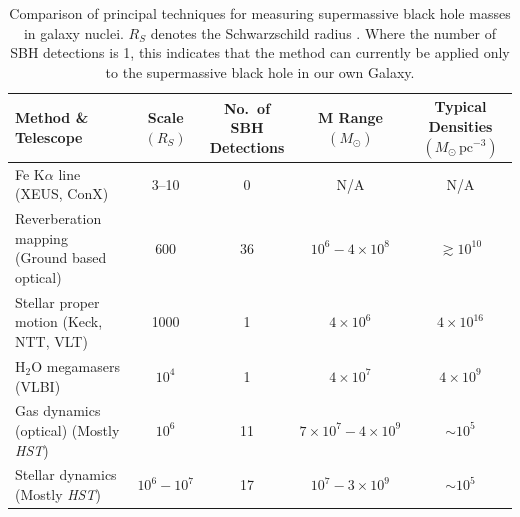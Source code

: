 \begin{table}[h!]
    \centering
    \footnotesize
    \begin{tabular}{p{4cm} c c c c}
        \toprule
        \textbf{Method \& Telescope} & 
        \makecell{\textbf{Scale} \\ $(R_S)$} & 
        \makecell{\textbf{No.\ of SBH} \\ \textbf{Detections}} & 
        \makecell{$\mathbf{M}$ \textbf{Range} \\ $(M_\odot)$} & 
        \makecell{\textbf{Typical Densities} \\ $(M_\odot\,\mathrm{pc}^{-3})$} \\
        \midrule
        
        Fe K$\alpha$ line \newline (XEUS, ConX) 
            & 3--10 
            & 0 
            & N/A 
            & N/A \\
        \addlinespace
        Reverberation mapping \newline (Ground based optical) 
            & 600 
            & 36 
            & $10^6 - 4 \times 10^8$ 
            & $\gtrsim 10^{10}$ \\
        \addlinespace
        Stellar proper motion \newline (Keck, NTT, VLT) 
            & 1000 
            & 1 
            & $4 \times 10^6$ 
            & $4 \times 10^{16}$ \\
        \addlinespace
        H$_2$O megamasers \newline (VLBI) 
            & $10^4$ 
            & 1 
            & $4 \times 10^7$ 
            & $4 \times 10^9$ \\
        \addlinespace
        Gas dynamics (optical) \newline (Mostly \emph{HST}) 
            & $10^6$ 
            & 11 
            & $7 \times 10^7 - 4 \times 10^9$ 
            & $\sim 10^5$ \\
        \addlinespace
        Stellar dynamics \newline (Mostly \emph{HST}) 
            & $10^6 - 10^7$ 
            & 17 
            & $10^7 - 3 \times 10^9$ 
            & $\sim 10^5$ \\
            
        \bottomrule
    \end{tabular}
    \caption{Comparison of principal techniques for measuring supermassive black hole masses in galaxy nuclei. $R_S$ denotes the Schwarzschild radius \cite{Ferrarese}. Where the number of SBH detections is 1, this indicates that the method can currently be applied only to the supermassive black hole in our own Galaxy.}
    \label{tab:bh_mass_methods}
\end{table}

